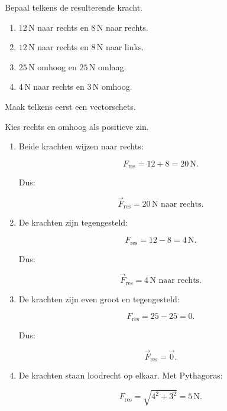 \documentclass{ximera}
\begin{document}
\begin{oefening}[Resultante]{\oefB\ESS}

Bepaal telkens de resulterende kracht.

\begin{enumerate}

 \item $12\,\mathrm N$ naar rechts en $8\,\mathrm N$ naar rechts.

 \item $12\,\mathrm N$ naar rechts en $8\,\mathrm N$ naar links.

 \item $25\,\mathrm N$ omhoog en $25\,\mathrm N$ omlaag.

 \item $4\,\mathrm N$ naar rechts en $3\,\mathrm N$ omhoog.

\end{enumerate}

Maak telkens eerst een vectorschets.


\begin{oplossing}

Kies rechts en omhoog als positieve zin.

\begin{enumerate}

  \item Beide krachten wijzen naar rechts:

  \[F_{\mathrm{res}}=12+8=20\,\mathrm N.\]

  Dus:

  \[\boxed{\vec F_{\mathrm{res}}=20\,\mathrm N\text{ naar rechts}}.\]

  \item De krachten zijn tegengesteld:

  \[F_{\mathrm{res}}=12-8=4\,\mathrm N.\]

  Dus:

  \[\boxed{\vec F_{\mathrm{res}}=4\,\mathrm N\text{ naar rechts}}.\]

  \item De krachten zijn even groot en tegengesteld:

  \[F_{\mathrm{res}}=25-25=0.\]

  Dus:

  \[\boxed{\vec F_{\mathrm{res}}=\vec 0}.\]

  \item De krachten staan loodrecht op elkaar. Met Pythagoras:

  \[F_{\mathrm{res}}=\sqrt{4^2+3^2}=5\,\mathrm N.\]


\end{enumerate}
\end{oplossing}
\end{oefening}
\end{document}
